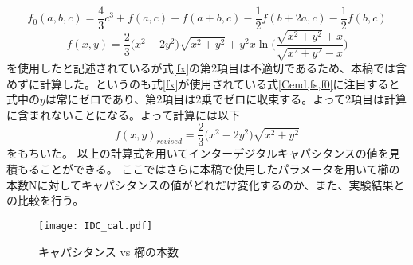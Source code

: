 \begin{equation}
    \label{f0}
    f_{0}(a, b, c) =\frac{4}{3} c^{3}+f(a, c)+f(a+b, c)-\frac{1}{2} f(b+2 a, c)-\frac{1}{2} f(b, c)
\end{equation}
\begin{equation}
    \label{fx}
    f(x, y) =\frac{2}{3}\biggl(x^{2}-2 y^{2}\biggr) \sqrt{x^{2}+y^{2}}+y^{2} x \ln \biggl(\frac{\sqrt{x^{2}+y^{2}}+x}{\sqrt{x^{2}+y^{2}}-x}\biggr)
\end{equation}
を使用したと記述されているが式\ref*{fx}の第2項目は不適切であるため、本稿では含めずに計算した。というのも式\ref*{fx}が使用されている式\ref{Cend,fs,f0}に注目すると式\label{fx}中の$y$は常にゼロであり、第2項目は2乗でゼロに収束する。よって2項目は計算に含まれないことになる。よって計算には以下
\begin{equation}
    \label{fx_re}
    f(x, y)_{revised} =\frac{2}{3}\biggl(x^{2}-2 y^{2}\biggr) \sqrt{x^{2}+y^{2}}
\end{equation}
をもちいた。
以上の計算式を用いてインターデジタルキャパシタンスの値を見積もることができる。
ここではさらに本稿で使用したパラメータを用いて櫛の本数Nに対してキャパシタンスの値がどれだけ変化するのか、また、実験結果との比較を行う。
\begin{figure}[H]
    \centering
    \texttt{[image: IDC\_cal.pdf]}
    \caption{キャパシタンス vs 櫛の本数}
\end{figure}
